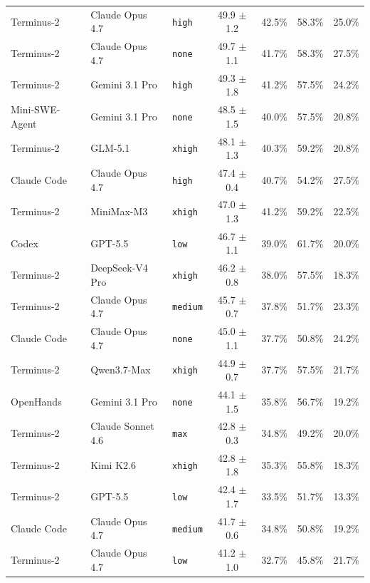 \documentclass{llmxive}
\begin{document}
\begin{table}[t]
\begin{tabular}{l l l c c c c}
Terminus-2     & Claude Opus 4.7           & \texttt{high}   & 49.9 $\pm$ 1.2 & 42.5\% & 58.3\% & 25.0\% \\
Terminus-2     & Claude Opus 4.7           & \texttt{none}   & 49.7 $\pm$ 1.1 & 41.7\% & 58.3\% & 27.5\% \\
Terminus-2     & Gemini 3.1 Pro            & \texttt{high}   & 49.3 $\pm$ 1.8 & 41.2\% & 57.5\% & 24.2\% \\
Mini-SWE-Agent & Gemini 3.1 Pro            & \texttt{none}   & 48.5 $\pm$ 1.5 & 40.0\% & 57.5\% & 20.8\% \\
Terminus-2     & GLM-5.1                   & \texttt{xhigh}  & 48.1 $\pm$ 1.3 & 40.3\% & 59.2\% & 20.8\% \\
Claude Code    & Claude Opus 4.7           & \texttt{high}   & 47.4 $\pm$ 0.4 & 40.7\% & 54.2\% & 27.5\% \\
Terminus-2     & MiniMax-M3                & \texttt{xhigh}  & 47.0 $\pm$ 1.3 & 41.2\% & 59.2\% & 22.5\% \\
Codex          & GPT-5.5                   & \texttt{low}    & 46.7 $\pm$ 1.1 & 39.0\% & 61.7\% & 20.0\% \\
Terminus-2     & DeepSeek-V4 Pro           & \texttt{xhigh}  & 46.2 $\pm$ 0.8 & 38.0\% & 57.5\% & 18.3\% \\
Terminus-2     & Claude Opus 4.7           & \texttt{medium} & 45.7 $\pm$ 0.7 & 37.8\% & 51.7\% & 23.3\% \\
Claude Code    & Claude Opus 4.7           & \texttt{none}   & 45.0 $\pm$ 1.1 & 37.7\% & 50.8\% & 24.2\% \\
Terminus-2     & Qwen3.7-Max               & \texttt{xhigh}  & 44.9 $\pm$ 0.7 & 37.7\% & 57.5\% & 21.7\% \\
OpenHands      & Gemini 3.1 Pro            & \texttt{none}   & 44.1 $\pm$ 1.5 & 35.8\% & 56.7\% & 19.2\% \\
Terminus-2     & Claude Sonnet 4.6         & \texttt{max}    & 42.8 $\pm$ 0.3 & 34.8\% & 49.2\% & 20.0\% \\
Terminus-2     & Kimi K2.6                 & \texttt{xhigh}  & 42.8 $\pm$ 1.8 & 35.3\% & 55.8\% & 18.3\% \\
Terminus-2     & GPT-5.5                   & \texttt{low}    & 42.4 $\pm$ 1.7 & 33.5\% & 51.7\% & 13.3\% \\
Claude Code    & Claude Opus 4.7           & \texttt{medium} & 41.7 $\pm$ 0.6 & 34.8\% & 50.8\% & 19.2\% \\
Terminus-2     & Claude Opus 4.7           & \texttt{low}    & 41.2 $\pm$ 1.0 & 32.7\% & 45.8\% & 21.7\% \\

\end{tabular}
\end{table}
\end{document}
